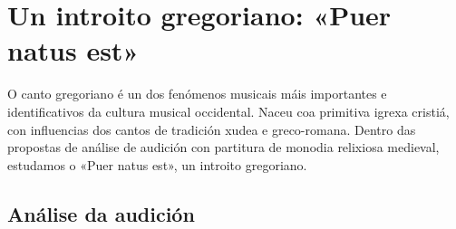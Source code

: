 %
%
\section{Un introito gregoriano: «Puer natus est»} \label{sec:Puer-natus}
%
O canto gregoriano é un dos fenómenos musicais máis importantes e identificativos da cultura musical occidental. Naceu coa primitiva igrexa cristiá, con influencias dos cantos de tradición  xudea e greco-romana.
%
Dentro das propostas de análise de audición con partitura de monodia relixiosa medieval, estudamos o «Puer natus est», un introito gregoriano.
%
\subsection*{Análise da audición} 


